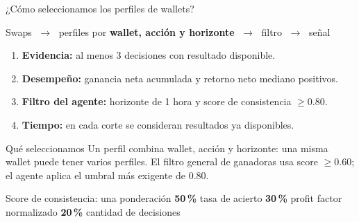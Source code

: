 \documentclass[10pt,aspectratio=169]{beamer}
\begin{document}
\begin{frame}{¿Cómo seleccionamos los perfiles de wallets?}
\begin{center}
\small
Swaps $\;\rightarrow\;$ perfiles por \textbf{wallet, acción y horizonte}
$\;\rightarrow\;$ filtro $\;\rightarrow\;$ señal
\end{center}
\vspace{.25em}
\begin{enumerate}\small
  \item \textbf{Evidencia:} al menos 3 decisiones con resultado disponible.
  \item \textbf{Desempeño:} ganancia neta acumulada y retorno neto mediano positivos.
  \item \textbf{Filtro del agente:} horizonte de 1 hora y score de consistencia $\geq 0.80$.
  \item \textbf{Tiempo:} en cada corte se consideran resultados ya disponibles.
\end{enumerate}
\begin{block}{Qué seleccionamos}
\small Un perfil combina wallet, acción y horizonte: una misma wallet puede tener varios perfiles.
El filtro general de ganadoras usa score $\geq 0.60$; el agente aplica el umbral más exigente de 0.80.
\end{block}
\begin{block}{Score de consistencia: una ponderación}
\centering\small
\textbf{50\,\%} tasa de acierto \quad
\textbf{30\,\%} profit factor normalizado \quad
\textbf{20\,\%} cantidad de decisiones
\end{block}
\end{frame}
\end{document}
